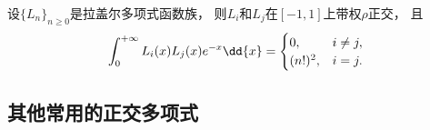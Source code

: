 \begin{property}
设\(\{L_n\}_{n\geq0}\)是拉盖尔多项式函数族，
则\(L_i\)和\(L_j\)在\([-1,1]\)上带权\(\rho\)正交，
且\begin{equation}
	\def\arraystretch{1.5}
	\int_0^{+\infty} L_i(x) L_j(x) e^{-x} \dd{x}
	= \begin{cases}
		0, & i \neq j, \\
		(n!)^2, & i = j.
	\end{cases}
\end{equation}
\end{property}

\subsection{其他常用的正交多项式}
